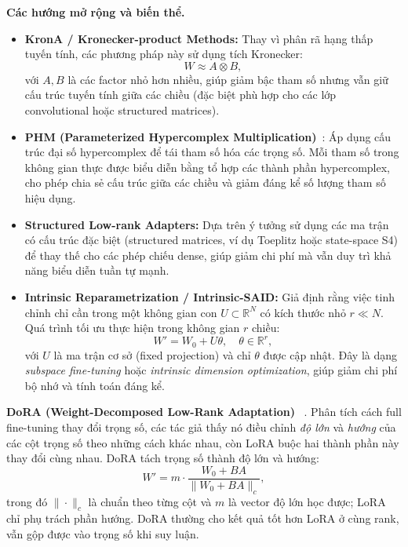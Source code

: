 \textbf{Các hướng mở rộng và biến thể.}
\begin{itemize}
	\item \textbf{KronA / Kronecker-product Methods\cite{buczak2023krona}:}  
	Thay vì phân rã hạng thấp tuyến tính, các phương pháp này sử dụng tích Kronecker:
	\[
	W \approx A \otimes B,
	\]
	với $A, B$ là các factor nhỏ hơn nhiều, giúp giảm bậc tham số nhưng vẫn giữ cấu trúc tuyến tính giữa các chiều (đặc biệt phù hợp cho các lớp convolutional hoặc structured matrices).
	
	\item \textbf{PHM (Parameterized Hypercomplex Multiplication)}~\cite{zhang2021phm}:  
	Áp dụng cấu trúc đại số hypercomplex để tái tham số hóa các trọng số.  
	Mỗi tham số trong không gian thực được biểu diễn bằng tổ hợp các thành phần hypercomplex, cho phép chia sẻ cấu trúc giữa các chiều và giảm đáng kể số lượng tham số hiệu dụng.  
	
	\item \textbf{Structured Low-rank Adapters:}
	Dựa trên ý tưởng sử dụng các ma trận có cấu trúc đặc biệt (structured matrices, ví dụ Toeplitz hoặc state-space S4) để thay thế cho các phép chiếu dense, giúp giảm chi phí mà vẫn duy trì khả năng biểu diễn tuần tự mạnh.
	
	\item \textbf{Intrinsic Reparametrization / Intrinsic-SAID:}  
	Giả định rằng việc tinh chỉnh chỉ cần trong một không gian con $U \subset \mathbb{R}^N$ có kích thước nhỏ $r \ll N$.  
	Quá trình tối ưu thực hiện trong không gian $r$ chiều:
	\[
	W' = W_0 + U \theta, \quad \theta \in \mathbb{R}^r,
	\]
	với $U$ là ma trận cơ sở (fixed projection) và chỉ $\theta$ được cập nhật.  
	Đây là dạng \textit{subspace fine-tuning} hoặc \textit{intrinsic dimension optimization}\cite{aghajanyan2021intrinsic}, giúp giảm chi phí bộ nhớ và tính toán đáng kể.
\end{itemize}

\textbf{DoRA (Weight-Decomposed Low-Rank Adaptation)}~\cite{liu2024dora} \newtag.
Phân tích cách full fine-tuning thay đổi trọng số, các tác giả thấy nó điều chỉnh \emph{độ lớn} và \emph{hướng} của các cột trọng số theo những cách khác nhau, còn LoRA buộc hai thành phần này thay đổi cùng nhau. DoRA tách trọng số thành độ lớn và hướng:
\[
W' = m \cdot \frac{W_0 + BA}{\|W_0 + BA\|_c},
\]
trong đó $\|\cdot\|_c$ là chuẩn theo từng cột và $m$ là vector độ lớn học được; LoRA chỉ phụ trách phần hướng. DoRA thường cho kết quả tốt hơn LoRA ở cùng rank, vẫn gộp được vào trọng số khi suy luận.

